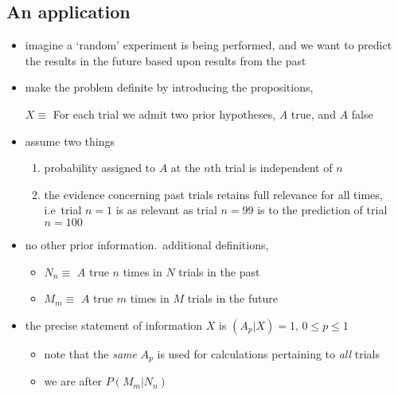 \documentclass[../jaynes_prob_theory_notes.tex]{subfiles}
\begin{document}
        \subsection{An application}
            \begin{itemize} 
                \item imagine a `random' experiment is being performed, and we want to predict the results in the future based upon results from the past
                \item make the problem definite by introducing the propositions,
                    \begin{displayquote}
                        \(X \equiv\) For each trial we admit two prior hypotheses, \(A\) true, and \(A\) false
                    \end{displayquote}
                \item assume two things
                    \begin{enumerate}
                        \item probability assigned to \(A\) at the \(n\)th trial is independent of \(n\)
                        \item the evidence concerning past trials retains full relevance for all times, i.e\ trial \(n=1\) is as relevant as trial \(n=99\) is to the prediction of trial \(n=100\)
                    \end{enumerate}
                \item no other prior information.\ additional definitions,
                \begin{displayquote}
                    \begin{itemize} 
                        \item[] \(N_n \equiv\) \(A\) true \(n\) times in \(N\) trials in the past
                        \item[] \(M_m \equiv\) \(A\) true \(m\) times in \(M\) trials in the future
                    \end{itemize}
                \end{displayquote}
                \item the precise statement of information \(X\) is \((A_p | X) = 1\), \(0 \leq p \leq 1\)
                    \begin{itemize} 
                        \item note that the \textit{same} \(A_p\) is used for calculations pertaining to \textit{all} trials
                        \item we are after \(P(M_m|N_n)\)

\end{itemize}
\end{itemize}
\end{document}
